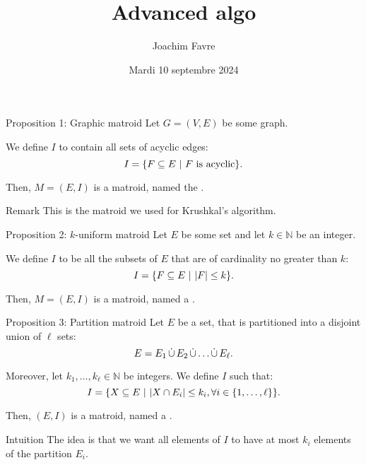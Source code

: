 \documentclass[a4paper]{article}
\title{Advanced algo}
\author{Joachim Favre}
\date{Mardi 10 septembre 2024}
\begin{document}
\maketitle


\begin{parag}{Proposition 1: Graphic matroid}
    Let $G = \left(V, E\right)$ be some graph.

    We define $I$ to contain all sets of acyclic edges:
    \[I = \left\{F \subseteq E \suchthat \text{$F$ is acyclic}\right\}.\]

    Then, $M = \left(E, I\right)$ is a matroid, named the .

    \begin{subparag}{Remark}
        This is the matroid we used for Krushkal's algorithm.
    \end{subparag}
\end{parag}

\begin{parag}{Proposition 2: $k$-uniform matroid}
    Let $E$ be some set and let $k \in \mathbb{N}$ be an integer.

    We define $I$ to be all the subsets of $E$ that are of cardinality no greater than $k$: 
    \[I = \left\{F \subseteq E \suchthat \left|F\right| \leq k\right\}.\]
    
    Then, $M = \left(E, I\right)$ is a matroid, named a .
\end{parag}

\begin{parag}{Proposition 3: Partition matroid}
    Let $E$ be a set, that is partitioned into a disjoint union of $\ell$ sets: 
    \[E = E_1 \operatorname*{\dot{\cup}} E_2 \operatorname*{\dot{\cup}} \ldots \operatorname*{\dot{\cup}} E_{\ell }.\]

    Moreover, let $k_1, \ldots, k_{\ell } \in \mathbb{N}$ be integers. We define $I$ such that: 
    \[I = \left\{X \subseteq E \suchthat \left|X \cap E_i\right| \leq k_i, \forall i \in \left\{1, \ldots, \ell \right\}\right\}.\]

    Then, $\left(E, I\right)$ is a matroid, named a .

    \begin{subparag}{Intuition}
        The idea is that we want all elements of $I$ to have at most $k_i$ elements of the partition $E_i$.
    \end{subparag}
\end{parag}
\end{document}
